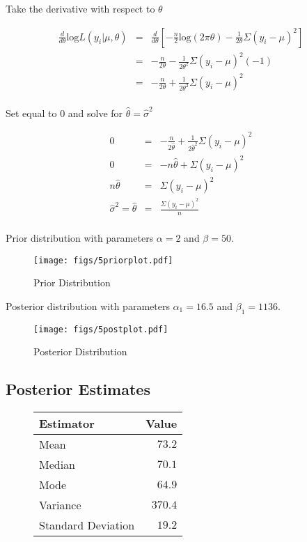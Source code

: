 \documentclass[12pt]{article}
\begin{document}
\noindent Take the derivative with respect to $\theta$

\begin{eqnarray*}
\frac{d}{d\theta}\mathrm{log}L(y_i|\mu,\theta) &=& \frac{d}{d\theta}\left[-\frac{n}{2}\mathrm{log}(2\pi\theta)-\frac{1}{2\theta}\Sigma(y_i-\mu)^2\right] \\
&=& -\frac{n}{2\theta}-\frac{1}{2\theta^2}\Sigma(y_i-\mu)^2(-1) \\
&=& -\frac{n}{2\theta}+\frac{1}{2\theta^2}\Sigma(y_i-\mu)^2 \\
\end{eqnarray*}

\noindent Set equal to 0 and solve for $\hat{\theta}=\hat{\sigma}^2$

\begin{eqnarray*}
0 &=& -\frac{n}{2\hat{\theta}}+\frac{1}{2\hat{\theta}^2}\Sigma(y_i-\mu)^2 \\
0 &=& -n\hat{\theta}+\Sigma(y_i-\mu)^2 \\
n\hat{\theta} &=& \Sigma(y_i-\mu)^2 \\
\hat{\sigma}^2=\hat{\theta} &=& \frac{\Sigma(y_i-\mu)^2}{n} \\
\end{eqnarray*}

\noindent Prior distribution with parameters $\alpha=2$ and $\beta=50$.

\begin{figure}[H]
\begin{center}
\texttt{[image: figs/5priorplot.pdf]}
\caption{Prior Distribution}
\end{center}
\end{figure}

\noindent Posterior distribution with parameters $\alpha_1=16.5$ and $\beta_1=1136$.

\begin{figure}[H]
\begin{center}
\texttt{[image: figs/5postplot.pdf]}
\caption{Posterior Distribution}
\end{center}
\end{figure}

\subsection{Posterior Estimates}

\begin{figure}[H]
\begin{center}
\begin{tabular}{l|r}
Estimator & \multicolumn{1}{l}{Value} \\ \hline \hline
Mean               & $73.2$ \\
Median             & $70.1$ \\
Mode               & $64.9$ \\
Variance           & $370.4$ \\
Standard Deviation & $19.2$ \\
\end{tabular}
\end{center}
\end{figure}
\end{document}
